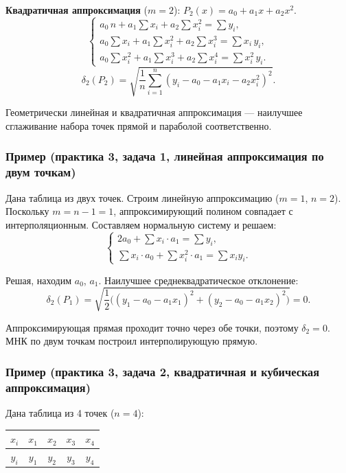 \textbf{Квадратичная аппроксимация} ($m = 2$): $P_2(x) = a_0 + a_1 x + a_2 x^2$.
\[
    \begin{cases}
        \displaystyle a_0\, n + a_1 \sum x_i + a_2 \sum x_i^2 = \sum y_i, \\[6pt]
        \displaystyle a_0 \sum x_i + a_1 \sum x_i^2 + a_2 \sum x_i^3 = \sum x_i\, y_i, \\[6pt]
        \displaystyle a_0 \sum x_i^2 + a_1 \sum x_i^3 + a_2 \sum x_i^4 = \sum x_i^2\, y_i.
    \end{cases}
\]
\[
    \delta_2(P_2) = \sqrt{\frac{1}{n} \sum_{i=1}^{n} (y_i - a_0 - a_1 x_i - a_2 x_i^2)^2}.
\]

Геометрически линейная и квадратичная аппроксимация --- наилучшее сглаживание набора точек прямой и параболой соответственно.


\subsubsection*{Пример (практика 3, задача 1, линейная аппроксимация по двум точкам)}

Дана таблица из двух точек. Строим линейную аппроксимацию ($m = 1$, $n = 2$). Поскольку $m = n - 1 = 1$, аппроксимирующий полином совпадает с интерполяционным. Составляем нормальную систему и решаем:
\[
    \begin{cases}
        2a_0 + \sum x_i \cdot a_1 = \sum y_i, \\
        \sum x_i \cdot a_0 + \sum x_i^2 \cdot a_1 = \sum x_i y_i.
    \end{cases}
\]

Решая, находим $a_0$, $a_1$. Наилучшее среднеквадратическое отклонение:
\[
    \delta_2(P_1) = \sqrt{\frac{1}{2}\bigl((y_1 - a_0 - a_1 x_1)^2 + (y_2 - a_0 - a_1 x_2)^2\bigr)} = 0.
\]

Аппроксимирующая прямая проходит точно через обе точки, поэтому $\delta_2 = 0$. МНК по двум точкам построил интерполирующую прямую.


\subsubsection*{Пример (практика 3, задача 2, квадратичная и кубическая аппроксимация)}

Дана таблица из 4 точек ($n = 4$):

\begin{center}
\begin{tabular}{c|cccc}
    $x_i$ & $x_1$ & $x_2$ & $x_3$ & $x_4$ \\
    \hline
    $y_i$ & $y_1$ & $y_2$ & $y_3$ & $y_4$
\end{tabular}
\end{center}


